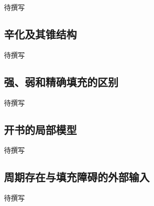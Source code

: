 
% 
% 
% 


待撰写

\subsection{辛化及其锥结构}
\label{g4:subsec:1304:01}
待撰写

\subsection{强、弱和精确填充的区别}
\label{g4:subsec:1304:02}
待撰写

\subsection{开书的局部模型}
\label{g4:subsec:1304:03}
待撰写

\subsection{周期存在与填充障碍的外部输入}
\label{g4:subsec:1304:04}
待撰写
